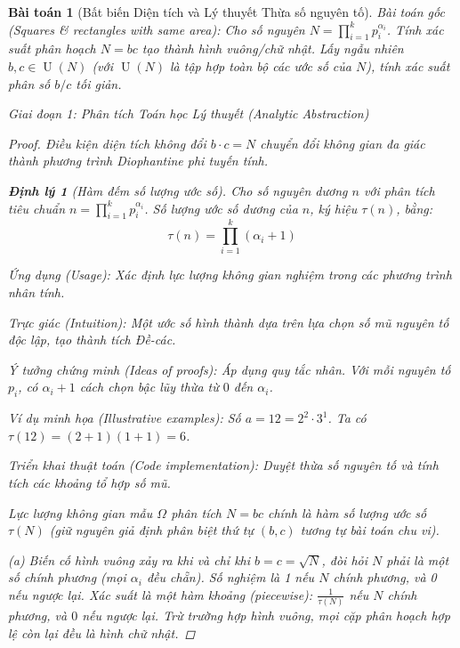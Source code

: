 \documentclass{article}
\newtheorem{baitoan}{Bài toán}
\newtheorem{dinhly}{Định lý}
\begin{document}

\begin{baitoan}[Bất biến Diện tích và Lý thuyết Thừa số nguyên tố]
 \emph{Bài toán gốc (Squares \& rectangles with same area):} 
 Cho số nguyên $N = \prod_{i=1}^k p_i^{\alpha_i}$. Tính xác suất phân hoạch $N=bc$ tạo thành hình vuông/chữ nhật. Lấy ngẫu nhiên $b,c \in \operatorname{U}(N)$ (với $\operatorname{U}(N)$ là tập hợp toàn bộ các ước số của $N$), tính xác suất phân số $b/c$ tối giản.

\vspace{0.5em}\noindent\emph{Giai đoạn 1: Phân tích Toán học Lý thuyết (Analytic Abstraction)}
 
 \begin{proof}
 Điều kiện diện tích không đổi $b \cdot c = N$ chuyển đổi không gian đa giác thành phương trình Diophantine phi tuyến tính. 

\begin{dinhly}[Hàm đếm số lượng ước số]
Cho số nguyên dương $n$ với phân tích tiêu chuẩn $n = \prod_{i=1}^{k} p_i^{\alpha_i}$. Số lượng ước số dương của $n$, ký hiệu $\tau(n)$, bằng:
\begin{equation*}
 \tau(n) = \prod_{i=1}^{k} (\alpha_i + 1)
\end{equation*}
\end{dinhly}

\emph{Ứng dụng (Usage):} Xác định lực lượng không gian nghiệm trong các phương trình nhân tính.

\emph{Trực giác (Intuition):} Một ước số hình thành dựa trên lựa chọn số mũ nguyên tố độc lập, tạo thành tích Đề-các.

\emph{Ý tưởng chứng minh (Ideas of proofs):} Áp dụng quy tắc nhân. Với mỗi nguyên tố $p_i$, có $\alpha_i + 1$ cách chọn bậc lũy thừa từ $0$ đến $\alpha_i$.

\emph{Ví dụ minh họa (Illustrative examples):} Số $a = 12 = 2^2 \cdot 3^1$. Ta có $\tau(12) = (2+1)(1+1) = 6$.

\emph{Triển khai thuật toán (Code implementation):}
Duyệt thừa số nguyên tố và tính tích các khoảng tổ hợp số mũ.


 Lực lượng không gian mẫu $\Omega$ phân tích $N = bc$ chính là hàm số lượng ước số $\tau(N)$ (giữ nguyên giả định phân biệt thứ tự $(b,c)$ tương tự bài toán chu vi).
 
 (a) Biến cố hình vuông xảy ra khi và chỉ khi $b = c = \sqrt{N}$, đòi hỏi $N$ phải là một số chính phương (mọi $\alpha_i$ đều chẵn). Số nghiệm là 1 nếu $N$ chính phương, và 0 nếu ngược lại. Xác suất là một hàm khoảng (piecewise): $\frac{1}{\tau(N)}$ nếu $N$ chính phương, và $0$ nếu ngược lại. Trừ trường hợp hình vuông, mọi cặp phân hoạch hợp lệ còn lại đều là hình chữ nhật.
 

\end{proof}
\end{baitoan}
\end{document}

